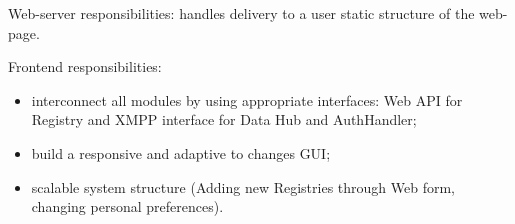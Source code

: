   Web-server responsibilities: handles delivery to a user static structure of the web-page.

  Frontend responsibilities:
  \begin{itemize}
  \item interconnect all modules by using appropriate interfaces: Web API for Registry and XMPP interface for Data Hub and AuthHandler;
  \item build a responsive and adaptive to changes GUI;
  \item scalable system structure (Adding new Registries through Web form, changing personal preferences).
  \end{itemize}